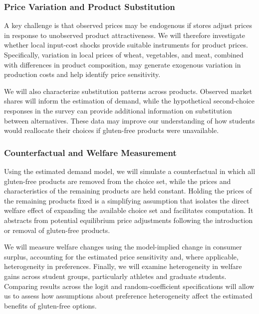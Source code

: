 \documentclass[
  11pt,
]{article}
\begin{document}
\subsubsection{Price Variation and Product
Substitution}\label{price-variation-and-product-substitution}

A key challenge is that observed prices may be endogenous if stores
adjust prices in response to unobserved product attractiveness. We will
therefore investigate whether local input-cost shocks provide suitable
instruments for product prices. Specifically, variation in local prices
of wheat, vegetables, and meat, combined with differences in product
composition, may generate exogenous variation in production costs and
help identify price sensitivity.

We will also characterize substitution patterns across products.
Observed market shares will inform the estimation of demand, while the
hypothetical second-choice responses in the survey can provide
additional information on substitution between alternatives. These data
may improve our understanding of how students would reallocate their
choices if gluten-free products were unavailable.

\subsubsection{Counterfactual and Welfare
Measurement}\label{counterfactual-and-welfare-measurement}

Using the estimated demand model, we will simulate a counterfactual in
which all gluten-free products are removed from the choice set, while
the prices and characteristics of the remaining products are held
constant. Holding the prices of the remaining products fixed is a
simplifying assumption that isolates the direct welfare effect of
expanding the available choice set and facilitates computation. It
abstracts from potential equilibrium price adjustments following the
introduction or removal of gluten-free products.

We will measure welfare changes using the model-implied change in
consumer surplus, accounting for the estimated price sensitivity and,
where applicable, heterogeneity in preferences. Finally, we will examine
heterogeneity in welfare gains across student groups, particularly
athletes and graduate students. Comparing results across the logit and
random-coefficient specifications will allow us to assess how
assumptions about preference heterogeneity affect the estimated benefits
of gluten-free options.
\end{document}

